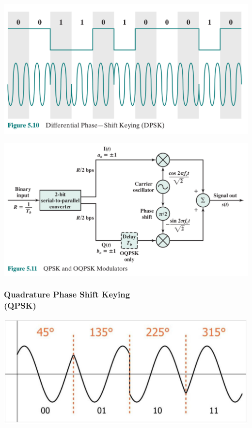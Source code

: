 \documentclass[pdflatex,compress]{beamer}
\begin{document}
\begin{frame}
	\begin{center}
		\includegraphics[width=\linewidth]{img/img14}
	\end{center}
\end{frame}

\begin{frame}
	\begin{center}
		\includegraphics[width=\linewidth]{img/img15}
	\end{center}
\end{frame}

\begin{frame}
	\frametitle{Quadrature Phase Shift Keying\\(QPSK)}
	\begin{center}
		\includegraphics[width=\linewidth]{img/img16}
	\end{center}
\end{frame}
\end{document}
